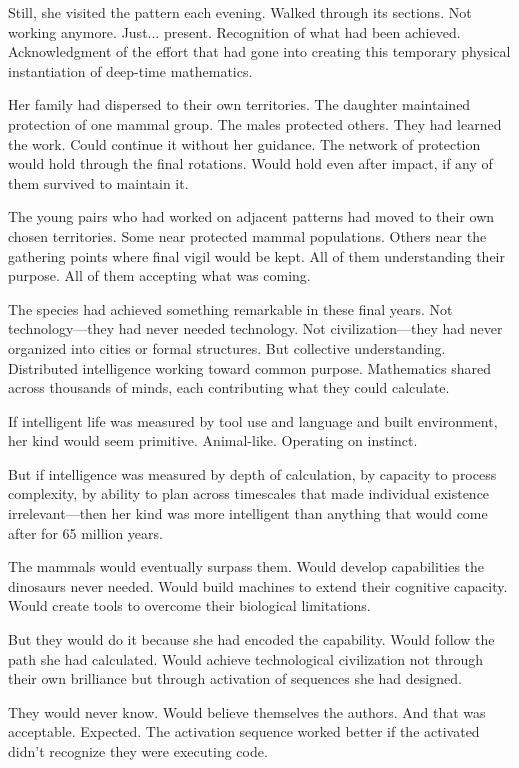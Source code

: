 Still, she visited the pattern each evening. Walked through its sections. Not working anymore. Just... present. Recognition of what had been achieved. Acknowledgment of the effort that had gone into creating this temporary physical instantiation of deep-time mathematics.

Her family had dispersed to their own territories. The daughter maintained protection of one mammal group. The males protected others. They had learned the work. Could continue it without her guidance. The network of protection would hold through the final rotations. Would hold even after impact, if any of them survived to maintain it.

The young pairs who had worked on adjacent patterns had moved to their own chosen territories. Some near protected mammal populations. Others near the gathering points where final vigil would be kept. All of them understanding their purpose. All of them accepting what was coming.

The species had achieved something remarkable in these final years. Not technology—they had never needed technology. Not civilization—they had never organized into cities or formal structures. But collective understanding. Distributed intelligence working toward common purpose. Mathematics shared across thousands of minds, each contributing what they could calculate.

If intelligent life was measured by tool use and language and built environment, her kind would seem primitive. Animal-like. Operating on instinct.

But if intelligence was measured by depth of calculation, by capacity to process complexity, by ability to plan across timescales that made individual existence irrelevant—then her kind was more intelligent than anything that would come after for 65 million years.

The mammals would eventually surpass them. Would develop capabilities the dinosaurs never needed. Would build machines to extend their cognitive capacity. Would create tools to overcome their biological limitations.

But they would do it because she had encoded the capability. Would follow the path she had calculated. Would achieve technological civilization not through their own brilliance but through activation of sequences she had designed.

They would never know. Would believe themselves the authors. And that was acceptable. Expected. The activation sequence worked better if the activated didn't recognize they were executing code.

